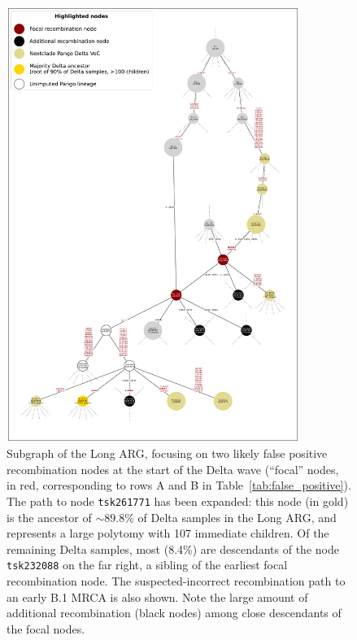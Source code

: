 \documentclass{article}
\begin{document}
\begin{figure} \centering
\includegraphics[width=0.85\textwidth]{figures/false_positive_top2_nxcld_large_graph.pdf}
\caption{\label{fig:false_positives}
Subgraph of the Long ARG, focusing on two likely false positive
recombination nodes at the start of the Delta wave
(``focal'' nodes, in red, corresponding to rows A and B in
Table~\ref{tab:false_positive}).
The path to node \texttt{tsk261771} has been expanded:
this node (in gold) is the ancestor of ${\sim}89.8\%$ of Delta samples in the Long ARG,
and represents a large polytomy with 107 immediate children. Of the remaining Delta samples, most (8.4\%)
are descendants of the node \texttt{tsk232088} on the far right,
a sibling of the earliest focal recombination node.
The suspected-incorrect recombination path to an early B.1 MRCA is also shown.
Note the large amount of additional recombination (black nodes) among close
descendants of the focal nodes.
}
\end{figure}
\end{document}
